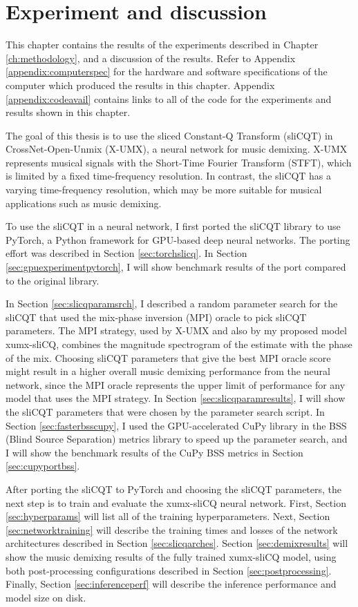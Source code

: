 \documentclass[report.tex]{subfiles}
\begin{document}
\section{Experiment and discussion}
\label{ch:experiment}

This chapter contains the results of the experiments described in Chapter \ref{ch:methodology}, and a discussion of the results. Refer to Appendix \ref{appendix:computerspec} for the hardware and software specifications of the computer which produced the results in this chapter. Appendix \ref{appendix:codeavail} contains links to all of the code for the experiments and results shown in this chapter.

The goal of this thesis is to use the sliced Constant-Q Transform (sliCQT) in CrossNet-Open-Unmix (X-UMX), a neural network for music demixing. X-UMX represents musical signals with the Short-Time Fourier Transform (STFT), which is limited by a fixed time-frequency resolution. In contrast, the sliCQT has a varying time-frequency resolution, which may be more suitable for musical applications such as music demixing.

To use the sliCQT in a neural network, I first ported the sliCQT library to use PyTorch, a Python framework for GPU-based deep neural networks. The porting effort was described in Section \ref{sec:torchslicq}. In Section \ref{sec:gpuexperimentpytorch}, I will show benchmark results of the port compared to the original library.

In Section \ref{sec:slicqparamsrch}, I described a random parameter search for the sliCQT that used the mix-phase inversion (MPI) oracle to pick sliCQT parameters. The MPI strategy, used by X-UMX and also by my proposed model xumx-sliCQ, combines the magnitude spectrogram of the estimate with the phase of the mix. Choosing sliCQT parameters that give the best MPI oracle score might result in a higher overall music demixing performance from the neural network, since the MPI oracle represents the upper limit of performance for any model that uses the MPI strategy. In Section \ref{sec:slicqparamresults}, I will show the sliCQT parameters that were chosen by the parameter search script. In Section \ref{sec:fasterbsscupy}, I used the GPU-accelerated CuPy library in the BSS (Blind Source Separation) metrics library to speed up the parameter search, and I will show the benchmark results of the CuPy BSS metrics in Section \ref{sec:cupyportbss}.

After porting the sliCQT to PyTorch and choosing the sliCQT parameters, the next step is to train and evaluate the xumx-sliCQ neural network. First, Section \ref{sec:hyperparams} will list all of the training hyperparameters. Next, Section \ref{sec:networktraining} will describe the training times and losses of the network architectures described in Section \ref{sec:slicqarches}. Section \ref{sec:demixresults} will show the music demixing results of the fully trained xumx-sliCQ model, using both post-processing configurations described in Section \ref{sec:postprocessing}. Finally, Section \ref{sec:inferenceperf} will describe the inference performance and model size on disk.
\end{document}
